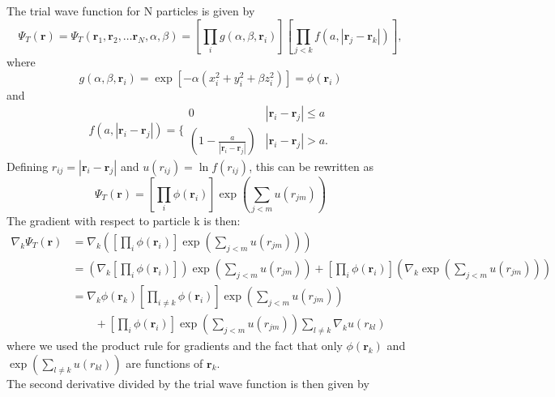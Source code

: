 \documentclass[%
oneside,                 %
final,                   %
10pt]{article}
\begin{document}
The trial wave function for N particles is given by 
\begin{equation}
 \Psi_T(\mathbf{r})=\Psi_T(\mathbf{r}_1, \mathbf{r}_2, \dots \mathbf{r}_N,\alpha,\beta)
 =\left[
    \prod_i g(\alpha,\beta,\mathbf{r}_i)
 \right]
 \left[
    \prod_{j<k}f(a,|\mathbf{r}_j-\mathbf{r}_k|)
 \right],
 \label{eq:trialwf}
 \end{equation}
where 
\begin{equation}
    g(\alpha,\beta,\mathbf{r}_i)= \exp{[-\alpha(x_i^2+y_i^2+\beta z_i^2)]}=\phi(\mathbf{r}_i)
 \end{equation}
 and 
 \begin{equation}
    f(a,|\mathbf{r}_i-\mathbf{r}_j|)=\Bigg\{
 \begin{array}{ll}
	 0 & {|\mathbf{r}_i-\mathbf{r}_j|} \leq {a}\\
	 (1-\frac{a}{|\mathbf{r}_i-\mathbf{r}_j|}) & {|\mathbf{r}_i-\mathbf{r}_j|} > {a}.
 \end{array}
 \end{equation}
Defining $r_{ij}=|\mathbf{r}_i-\mathbf{r}_j|$ and $u(r_{ij})=\ln{f(r_{ij})}$,
this can be rewritten as 
\begin{equation*}
\Psi_T(\mathbf{r})=\left[
    \prod_i \phi(\mathbf{r}_i)
\right]
\exp{\left(\sum_{j<m}u(r_{jm})\right)}
\end{equation*}
The gradient with respect to particle k is then:
\begin{align*}
  \nabla_k\Psi_T(\mathbf{r})&= \nabla_k\left(\left[\prod_i \phi(\mathbf{r}_i)\right]
\exp{\left(\sum_{j<m}u(r_{jm})\right)}\right)
  \\
  & = \left(\nabla_k\left[\prod_i \phi(\mathbf{r}_i)\right]\right)\exp{\left(\sum_{j<m}u(r_{jm})\right)} + \left[\prod_i \phi(\mathbf{r}_i)\right]\left(\nabla_k
\exp{\left(\sum_{j<m}u(r_{jm})\right)}\right)
  \\
  & = \nabla_k\phi(\mathbf{r}_k)\left[\prod_{i\ne k}\phi(\mathbf{r}_i)\right]\exp{\left(\sum_{j<m}u(r_{jm})\right)}
  \\
  &\qquad
  +  \left[\prod_i\phi(\mathbf{r}_i)\right]
  \exp{\left(\sum_{j<m}u(r_{jm})\right)}\sum_{l\ne k}\nabla_k u(r_{kl})
\end{align*}
where we used the product rule for gradients and the fact that only $\phi(\mathbf{r}_k)$ and $\exp(\sum_{l\ne k}u(r_{kl}))$ are functions of $\mathbf{r}_k$.
\\
The second derivative divided by the trial wave function is then given by 
\end{document}
